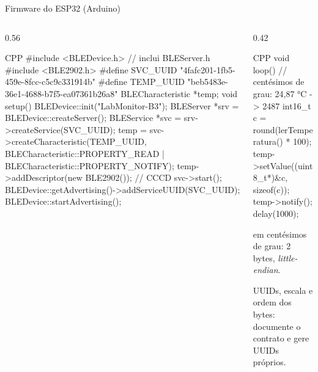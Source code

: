 \documentclass[aspectratio=169,10pt]{beamer}
\begin{document}
\begin{frame}[fragile]{Firmware do ESP32 (Arduino)}
  \begin{columns}[T]
    \begin{column}{0.56\textwidth}
\begin{codigo}[title=labmonitor\_ble.ino --- configuração]{CPP}
#include <BLEDevice.h>   // inclui BLEServer.h
#include <BLE2902.h>
#define SVC_UUID  "4fafc201-1fb5-459e-8fcc-c5c9c331914b"
#define TEMP_UUID "beb5483e-36e1-4688-b7f5-ea07361b26a8"
BLECharacteristic *temp;
void setup() {
  BLEDevice::init("LabMonitor-B3");
  BLEServer *srv = BLEDevice::createServer();
  BLEService *svc = srv->createService(SVC_UUID);
  temp = svc->createCharacteristic(TEMP_UUID,
    BLECharacteristic::PROPERTY_READ |
    BLECharacteristic::PROPERTY_NOTIFY);
  temp->addDescriptor(new BLE2902());   // CCCD
  svc->start();
  BLEDevice::getAdvertising()->addServiceUUID(SVC_UUID);
  BLEDevice::startAdvertising();
}
\end{codigo}
    \end{column}
    \begin{column}{0.42\textwidth}
\begin{codigo}[title=--- laço principal]{CPP}
void loop() {
  // centésimos de grau: 24,87 °C -> 2487
  int16_t c = round(lerTemperatura() * 100);
  temp->setValue((uint8_t*)&c, sizeof(c));
  temp->notify();
  delay(1000);
}
\end{codigo}
      \begin{conceito}
         em centésimos de grau: 2 bytes, \emph{little-endian}.
      \end{conceito}
      \begin{atencao}[Contrato]
        UUIDs, escala e ordem dos bytes: documente o contrato e gere UUIDs próprios.
      \end{atencao}
    \end{column}
  \end{columns}
\end{frame}
\end{document}
